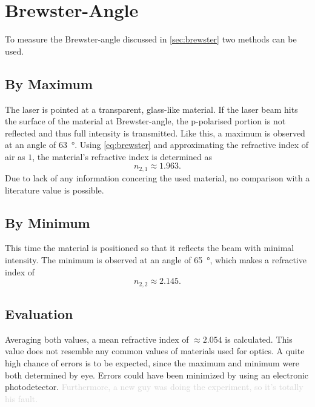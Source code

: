 \chapter{Brewster-Angle}
To measure the Brewster-angle discussed in \autoref{sec:brewster} two methods can be used.

\section{By Maximum}
The laser is pointed at a transparent, glass-like material.
If the laser beam hits the surface of the material at Brewster-angle, the p-polarised portion is not reflected and thus full intensity is transmitted.
Like this, a maximum is observed at an angle of \SI{63}{\degree}.
Using \autoref{eq:brewster} and approximating the refractive index of air as $1$, the material's refractive index is determined as
\begin{equation*}
	n_{2,1}\approx\num{1.963}.
\end{equation*}
Due to lack of any information concering the used material, no comparison with a literature value is possible.

\section{By Minimum}
This time the material is positioned so that it reflects the beam with minimal intensity.
The minimum is observed at an angle of \SI{65}{\degree}, which makes a refractive index of
\begin{equation*}
	n_{2,2}\approx\num{2.145}.
\end{equation*}

\section{Evaluation}
Averaging both values, a mean refractive index of $\approx\num{2.054}$ is calculated.
This value does not resemble any common values of materials used for optics.
A quite high chance of errors is to be expected, since the maximum and minimum were both determined by eye.
Errors could have been minimized by using an electronic photodetector.
\textcolor{lightgray}{Furthermore, a new guy was doing the experiment, so it's totally his fault.}
